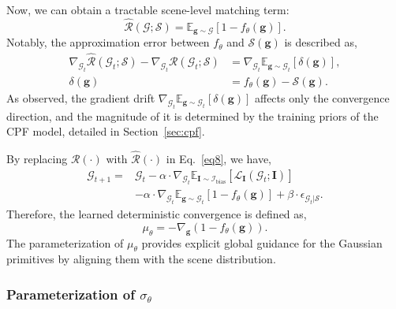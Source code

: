 \documentclass[lettersize,journal]{IEEEtran}
\begin{document}
Now, we can obtain a tractable scene-level matching term:
\begin{equation}
    \widehat{\mathcal{R}}(\mathcal{G};\mathcal{S}) = \mathbb{E}_{\mathbf{g} \sim \mathcal{G}} \left[ 1 - f_{\theta} (\mathbf{g}) \right].
    \label{eq11}
\end{equation}
Notably, the approximation error between $f_{\theta}$ and $\mathcal{S}(\mathbf{g})$ is described as, 
\begin{equation}
    \begin{aligned}
    \nabla_{\mathcal{G}_t} \widehat{\mathcal{R}}(\mathcal{G}_t;\mathcal{S}) - \nabla_{\mathcal{G}_t} \mathcal{R}(\mathcal{G}_t;\mathcal{S}) &= \nabla_{\mathcal{G}_t} \mathbb{E}_{\mathbf{g} \sim \mathcal{G}_t} \left[ \delta(\mathbf{g}) \right], \\
    \delta(\mathbf{g}) &= f_{\theta} (\mathbf{g}) - \mathcal{S} (\mathbf{g}).
    \end{aligned}
    \label{eq12}
\end{equation}
As observed, the 
gradient drift $\nabla_{\mathcal{G}_t} \mathbb{E}_{\mathbf{g} \sim \mathcal{G}_t} \left[ \delta(\mathbf{g}) \right]$ affects only the convergence direction, and the magnitude of it is determined by the training priors of the CPF model, detailed in Section~\ref{sec:cpf}.

By replacing $\mathcal{R}(\cdot)$ with $\widehat{\mathcal{R}}(\cdot)$ in Eq.~\ref{eq8}, we have, 
\begin{equation}
    \begin{aligned}
    \mathcal{G}_{t+1} = &\mathcal{G}_t - \alpha \cdot \nabla_{\mathcal{G}_t} \mathbb{E}_{\mathbf{I}\sim\mathcal{I}_{\text{bias}}}\!\left[\mathcal{L}_{\mathbf{I}}(\mathcal{G}_t;\mathbf{I})\right] \\
    &- \alpha \cdot \nabla_{\mathcal{G}_t} \mathbb{E}_{\mathbf{g} \sim \mathcal{G}_t} \left[ 1 - f_{\theta}( \mathbf{g} ) \right] + \beta \cdot \epsilon_{\mathcal{G}_t \vert \mathcal{S}}.
    \end{aligned}
    \label{eq13}
\end{equation}
Therefore, the learned deterministic convergence is defined as, 
\begin{equation}
    \mu_{\theta} = -  \nabla_{\mathbf{g}}  (1 - f_{\theta}(\mathbf{g})).
    \label{eq13.1}
\end{equation}
The parameterization of $\mu_{\theta}$ provides explicit global guidance 
for the Gaussian primitives by aligning them with the scene distribution.

\subsubsection{Parameterization of $\sigma_{\theta}$}
\end{document}

